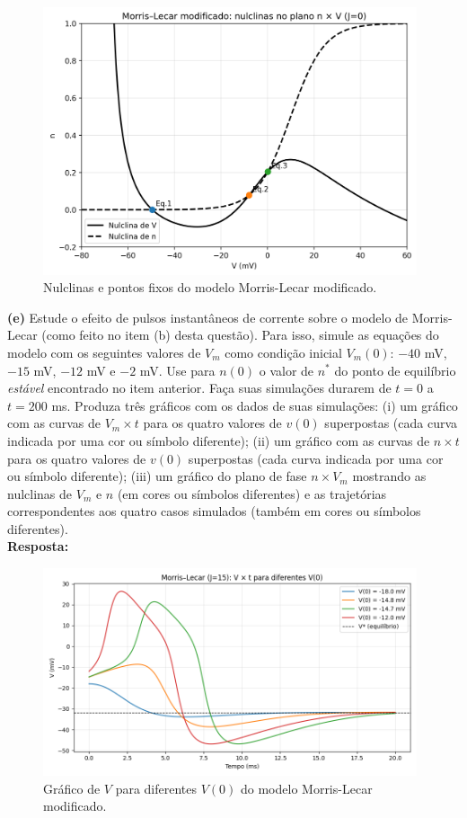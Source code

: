 \documentclass[english,11pt,a4paper]{article}
\begin{document}
	
	\begin{figure}[H]
		\centering
		\includegraphics[width=11cm]{../figures/ex_2d.png}
		\caption{Nulclinas e pontos fixos do modelo Morris-Lecar modificado.}
	\end{figure}
	
	\noindent\textbf{(e)} Estude o efeito de pulsos instantâneos de corrente sobre o modelo de Morris-Lecar (como feito no item (b) desta questão). Para isso, simule as equações do modelo com os seguintes valores de $V_m$ como condição inicial $V_m(0)$: $-40$ mV, $-15$ mV, $-12$ mV e $-2$ mV. Use para $n(0)$ o valor de $n^*$ do ponto de equilíbrio \textit{estável} encontrado no item anterior. Faça suas simulações durarem de $t = 0$ a $t = 200$ ms. Produza três gráficos com os dados de suas simulações: (i) um gráfico com as curvas de $V_m \times t$ para os quatro valores de $v(0)$ superpostas (cada curva indicada por uma cor ou símbolo diferente); (ii) um gráfico com as curvas de $n \times t$ para os quatro valores de $v(0)$ superpostas (cada curva indicada por uma cor ou símbolo diferente); (iii) um gráfico do plano de fase $n \times V_m$ mostrando as nulclinas de $V_m$ e $n$ (em cores ou símbolos diferentes) e as trajetórias correspondentes aos quatro casos simulados (também em cores ou símbolos diferentes).\\
	
	\noindent\textbf{Resposta:}
	
	\begin{figure}[H]
		\centering
		\includegraphics[width=11cm]{../figures/ex_2b_1.png}
		\caption{Gráfico de $V$ para diferentes $V(0)$ do modelo Morris-Lecar modificado.}
	\end{figure}
	
\end{document}
